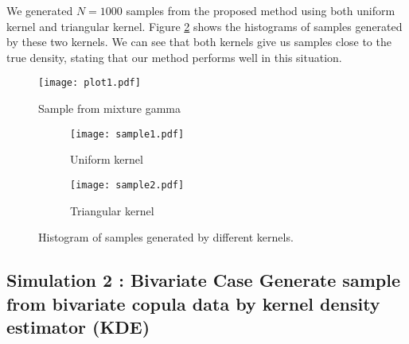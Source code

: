 \documentclass[letterpaper,12pt,hidelinks]{article}
\begin{document}
We generated $N = 1000$ samples from the proposed method using both uniform kernel and triangular kernel. Figure \ref{fig:sample_u} shows the histograms of samples generated by these two kernels. We can see that both kernels give us samples close to the true density, stating that our method performs well in this situation.

\begin{figure}[h]
  \centering
  \texttt{[image: plot1.pdf]}
  \caption{Sample from mixture gamma}
  \label{p4}
\end{figure}





\begin{figure}[htp]
\centering
  \begin{subfigure}{0.44\textwidth}
  \texttt{[image: sample1.pdf]}
  \caption{Uniform kernel}
  \end{subfigure}
  \begin{subfigure}{0.44\textwidth}
  \texttt{[image: sample2.pdf]}
  \caption{Triangular kernel}
  \end{subfigure}
  \caption{Histogram of samples generated by different kernels.}
  \label{fig:sample_u}
\end{figure}




\subsection{Simulation 2 : Bivariate Case Generate sample from bivariate copula data by kernel density estimator (KDE)}\label{sec:bivariate}
\end{document}
